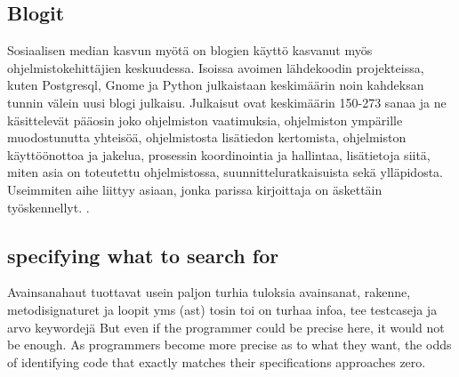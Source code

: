 \documentclass[finnish]{../tktltiki2}
\theoremstyle{definition}
\theoremstyle{remark}
\begin{document}
\subsection{Blogit}
Sosiaalisen median kasvun myötä on blogien käyttö kasvanut myös ohjelmistokehittäjien keskuudessa. Isoissa avoimen lähdekoodin projekteissa, kuten Postgresql, Gnome ja Python julkaistaan keskimäärin noin kahdeksan tunnin välein uusi blogi julkaisu. Julkaisut ovat keskimäärin 150-273 sanaa ja ne käsittelevät pääosin joko ohjelmiston vaatimuksia, ohjelmiston ympärille muodostunutta yhteisöä, ohjelmistosta lisätiedon kertomista, ohjelmiston käyttöönottoa ja jakelua, prosessin koordinointia ja hallintaa, lisätietoja siitä, miten asia on toteutettu ohjelmistossa, suunnitteluratkaisuista sekä ylläpidosta. Useimmiten aihe liittyy asiaan, jonka parissa kirjoittaja on äskettäin työskennellyt. \cite{how-dev-blog}.

\subsection{specifying what to search for}
Avainsanahaut tuottavat usein paljon turhia tuloksia
avainsanat, rakenne, metodisignaturet ja loopit yms (ast) tosin toi on turhaa infoa, tee testcaseja ja arvo keywordejä
But even if the programmer could be precise here, it would not be enough. As programmers become more precise as to what they want, the odds of identifying code that exactly matches their specifications approaches zero.

\end{document}

